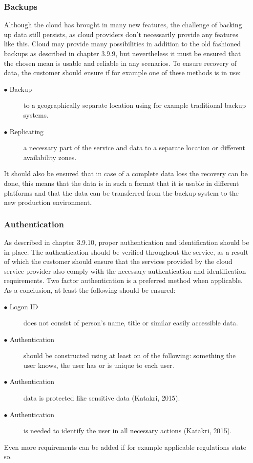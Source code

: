 \documentclass{article}
\begin{document}
\subsubsection{Backups}
Although the cloud has brought in many new features, the challenge of backing up data still persists, as cloud providers don't necessarily provide any features like this. Cloud may provide many possibilities in addition to the old fashioned backups as described in chapter 3.9.9, but nevertheless it must be ensured that the chosen mean is usable and reliable in any scenarios. To ensure recovery of data, the customer should ensure if for example one of these methods is in use:
\begin{description}
	\item[$\bullet$ Backup] to a geographically separate location using for example traditional backup systems.
	\item[$\bullet$ Replicating] a necessary part of the service and data to a separate location or different availability zones.
\end{description}
It should also be ensured that in case of a complete data loss the recovery can be done, this means that the data is in such a format that it is usable in different platforms and that the data can be transferred from the backup system to the new production environment.

\subsubsection{Authentication}
As described in chapter 3.9.10, proper authentication and identification should be in place. The authentication should be verified throughout the service, as a result of which the customer should ensure that the services provided by the cloud service provider also comply with the necessary authentication and identification requirements. Two factor authentication is a preferred method when applicable. As a conclusion, at least the following should be ensured:
\begin{description}
	\item[$\bullet$ Logon ID] does not consist of person's name, title or similar easily accessible data.
	\item[$\bullet$ Authentication] should be constructed using at least on of the following: something the user knows, the user has or is unique to each user.
	\item[$\bullet$ Authentication] data is protected like sensitive data (Katakri, 2015).
	\item[$\bullet$ Authentication] is needed to identify the user in all necessary actions (Katakri, 2015).
\end{description}
Even more requirements can be added if for example applicable regulations state so.
\end{document}
